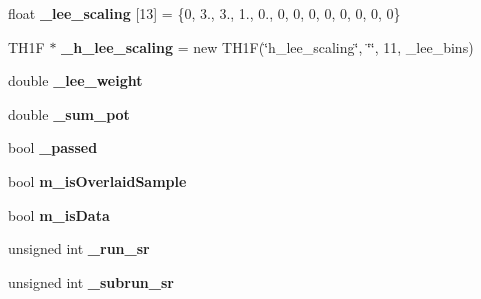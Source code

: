 \begin{DoxyCompactItemize}
\item 
\hypertarget{classlee_1_1ElectronNeutrinoFilter_a3c12458489f044717ce4acbb46ec8a5c}{float {\bfseries \-\_\-lee\-\_\-scaling} \mbox{[}13\mbox{]} = \{0, 3., 3., 1., 0., 0, 0, 0, 0, 0, 0, 0, 0\}}\label{classlee_1_1ElectronNeutrinoFilter_a3c12458489f044717ce4acbb46ec8a5c}

\item 
\hypertarget{classlee_1_1ElectronNeutrinoFilter_a4603c127eb117ed2e1cb0cc2f9ab8305}{T\-H1\-F $\ast$ {\bfseries \-\_\-h\-\_\-lee\-\_\-scaling} = new T\-H1\-F(\char`\"{}h\-\_\-lee\-\_\-scaling\char`\"{}, \char`\"{}\char`\"{}, 11, \-\_\-lee\-\_\-bins)}\label{classlee_1_1ElectronNeutrinoFilter_a4603c127eb117ed2e1cb0cc2f9ab8305}

\item 
\hypertarget{classlee_1_1ElectronNeutrinoFilter_a709a8b99dfeeecb1bcfa257b68720668}{double {\bfseries \-\_\-lee\-\_\-weight}}\label{classlee_1_1ElectronNeutrinoFilter_a709a8b99dfeeecb1bcfa257b68720668}

\item 
\hypertarget{classlee_1_1ElectronNeutrinoFilter_aadae83131c4d4009edd132f1e235a8fb}{double {\bfseries \-\_\-sum\-\_\-pot}}\label{classlee_1_1ElectronNeutrinoFilter_aadae83131c4d4009edd132f1e235a8fb}

\item 
\hypertarget{classlee_1_1ElectronNeutrinoFilter_a33bf99b17017e472dc71e7e2cf48c1e6}{bool {\bfseries \-\_\-passed}}\label{classlee_1_1ElectronNeutrinoFilter_a33bf99b17017e472dc71e7e2cf48c1e6}

\item 
\hypertarget{classlee_1_1ElectronNeutrinoFilter_acba0453be53b5ce2cdf28552611f6711}{bool {\bfseries m\-\_\-is\-Overlaid\-Sample}}\label{classlee_1_1ElectronNeutrinoFilter_acba0453be53b5ce2cdf28552611f6711}

\item 
\hypertarget{classlee_1_1ElectronNeutrinoFilter_abc078c72f7360f21250dfa5f16eace15}{bool {\bfseries m\-\_\-is\-Data}}\label{classlee_1_1ElectronNeutrinoFilter_abc078c72f7360f21250dfa5f16eace15}

\item 
\hypertarget{classlee_1_1ElectronNeutrinoFilter_a18314044dbcc5e207627d51bf023caa3}{unsigned int {\bfseries \-\_\-run\-\_\-sr}}\label{classlee_1_1ElectronNeutrinoFilter_a18314044dbcc5e207627d51bf023caa3}

\item 
\hypertarget{classlee_1_1ElectronNeutrinoFilter_a4c94603539c2385aa2506873642f4d10}{unsigned int {\bfseries \-\_\-subrun\-\_\-sr}}\label{classlee_1_1ElectronNeutrinoFilter_a4c94603539c2385aa2506873642f4d10}


\end{DoxyCompactItemize}
